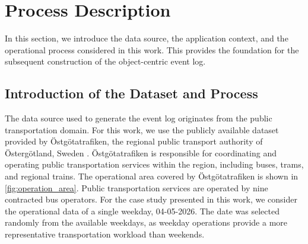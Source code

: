 \section{Process Description}
In this section, we introduce the data source, the application context, and the operational process considered in this work. This provides the foundation for the subsequent construction of the object-centric event log.




\subsection{Introduction of the Dataset and Process}
The data source used to generate the event log originates from the public transportation domain. For this work, we use the publicly available dataset provided by Östgötatrafiken, the regional public transport authority of Östergötland, Sweden . Östgötatrafiken is responsible for coordinating and operating public transportation services within the region, including buses, trams, and regional trains. The operational area covered by Östgötatrafiken is shown in \autoref{fig:operation_area}. Public transportation services are operated by nine contracted bus operators. For the case study presented in this work, we consider the operational data of a single weekday, 04-05-2026. The date was selected randomly from the available weekdays, as weekday operations provide a more representative transportation workload than weekends. %

